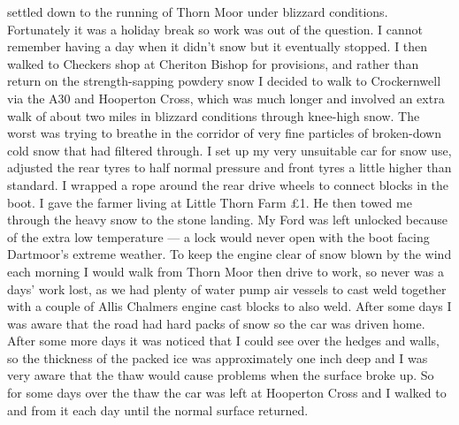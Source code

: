 settled down to the running of Thorn Moor under blizzard conditions.
Fortunately it was a holiday break so work was out of the question. I cannot
remember having a day when it didn't snow but it eventually stopped. I then
walked to Checkers shop at Cheriton Bishop for provisions, and rather than
return on the strength-sapping powdery snow I decided to walk to Crockernwell
via the A30 and Hooperton Cross, which was much longer and involved an extra
walk of about two miles in blizzard conditions through knee-high snow. The
worst was trying to breathe in the corridor of very fine particles of
broken-down cold snow that had filtered through. I set up my very unsuitable
car for snow use, adjusted the rear tyres to half normal pressure and front
tyres a little higher than standard. I wrapped a rope around the rear drive
wheels to connect blocks in the boot. I gave the farmer living at Little Thorn
Farm £1. He then towed me through the heavy snow to the stone landing. My Ford
was left unlocked because of the extra low temperature --- a lock would never
open with the boot facing Dartmoor's extreme weather. To keep the engine clear
of snow blown by the wind each morning I would walk from Thorn Moor then drive
to work, so never was a days' work lost, as we had plenty of water pump air
vessels to cast weld together with a couple of Allis Chalmers engine cast
blocks to also weld. After some days I was aware that the road had hard packs
of snow so the car was driven home. After some more days it was noticed that I
could see over the hedges and walls, so the thickness of the packed ice was
approximately one inch deep and I was very aware that the thaw would cause
problems when the surface broke up. So for some days over the thaw the car was
left at Hooperton Cross and I walked to and from it each day until the normal
surface returned.
